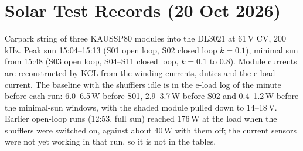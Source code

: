 \section{Solar Test Records (20 Oct 2026)}
\label{app:solar}
Carpark string of three KAUSSP80 modules into the DL3021 at 61\,V CV, 200\,kHz. Peak sun 15:04--15:13 (S01 open loop, S02 closed loop $k=0.1$), minimal sun from 15:48 (S03 open loop, S04--S11 closed loop, $k = 0.1$ to 0.8). Module currents are reconstructed by KCL from the winding currents, duties and the e-load current. The baseline with the shufflers idle is in the e-load log of the minute before each run: 6.0--6.5\,W before S01, 2.9--3.7\,W before S02 and 0.4--1.2\,W before the minimal-sun windows, with the shaded module pulled down to 14--18\,V. Earlier open-loop runs (12:53, full sun) reached 176\,W at the load when the shufflers were switched on, against about 40\,W with them off; the current sensors were not yet working in that run, so it is not in the tables.



